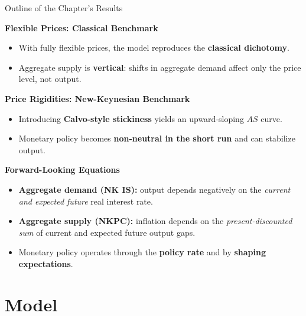 \documentclass[11pt,aspectratio=169]{beamer}
\begin{document}
\begin{frame}{Outline of the Chapter’s Results}
\small

\textbf{Flexible Prices: Classical Benchmark}
\begin{itemize}
  \item With fully flexible prices, the model reproduces the \textbf{classical dichotomy}.
  \item Aggregate supply is \textbf{vertical}: shifts in aggregate demand affect only the price level, not output.
\end{itemize}

\vspace{0.15cm}

\textbf{Price Rigidities: New-Keynesian Benchmark}
\begin{itemize}
  \item Introducing \textbf{Calvo-style stickiness} yields an upward-sloping $AS$ curve.
  \item Monetary policy becomes \textbf{non-neutral in the short run} and can stabilize output.
\end{itemize}

\vspace{0.15cm}

\textbf{Forward-Looking Equations}
\begin{itemize}
  \item \textbf{Aggregate demand (NK IS):} output depends negatively on the \emph{current and expected future} real interest rate.
  \item \textbf{Aggregate supply (NKPC):} inflation depends on the \emph{present-discounted sum} of current and expected future output gaps.
  \item Monetary policy operates through the \textbf{policy rate} and by \textbf{shaping expectations}.
\end{itemize}

\end{frame}


\section{Model}
\end{document}
